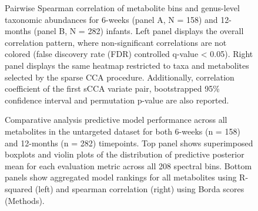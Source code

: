\begin{figure}
    \centering
    \caption[Pairwise Spearman correlation of metabolite bins and genus-level taxonomic abundances for 6-weeks (panel A, N = 158) and 12-months (panel B, N = 282) infants.]{Pairwise Spearman correlation of metabolite bins and genus-level taxonomic abundances for 6-weeks (panel A, N = 158) and 12-months (panel B, N = 282) infants. Left panel displays the overall correlation pattern, where non-significant correlations are not colored (false discovery rate (FDR) controlled q-value < 0.05). Right panel displays the same heatmap restricted to taxa and metabolites selected by the sparse CCA procedure. Additionally, correlation coefficient of the first sCCA variate pair, bootstrapped 95\% confidence interval and permutation p-value are also reported.}
    \label{fig:b2}
\end{figure}

\begin{figure}
    \centering
    \caption[Comparative analysis predictive model performance across all metabolites in the untargeted dataset for both 6-weeks (n = 158) and 12-months (n = 282) timepoints.]{Comparative analysis predictive model performance across all metabolites in the untargeted dataset for both 6-weeks (n = 158) and 12-months (n = 282) timepoints. Top panel shows superimposed boxplots and violin plots of the distribution of predictive posterior mean for each evaluation metric across all 208 spectral bins. Bottom panels show aggregated model rankings for all metabolites using R-squared (left) and spearman correlation (right) using Borda scores (Methods).}
    \label{fig:b3}
\end{figure}


